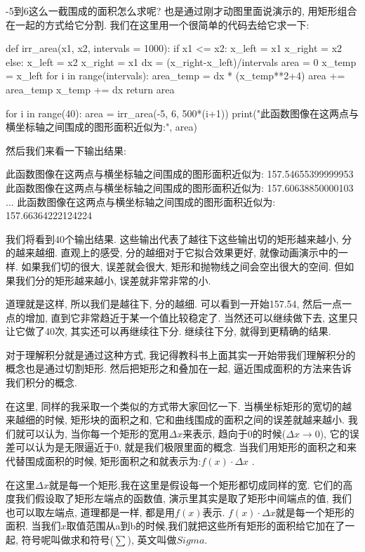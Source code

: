 -5到6这么一截围成的面积怎么求呢? 也是通过刚才动图里面说演示的, 用矩形组合在一起的方式给它分割. 我们在这里用一个很简单的代码去给它求一下:

\begin{python}
def irr_area(x1, x2, intervals = 1000):
    if x1 <= x2:
        x_left = x1
        x_right = x2
    else:
        x_left = x2
        x_right = x1
    dx = (x_right-x_left)/intervals
    area = 0
    x_temp = x_left
    for i in range(intervals):
        area_temp = dx * (x_temp**2+4)
        area += area_temp
        x_temp += dx
    return area
  
 for i in range(40):
    area = irr_area(-5, 6, 500*(i+1))
    print("此函数图像在这两点与横坐标轴之间围成的图形面积近似为:", area)
\end{python}

然后我们来看一下输出结果:

\begin{python}
此函数图像在这两点与横坐标轴之间围成的图形面积近似为: 157.54655399999953
此函数图像在这两点与横坐标轴之间围成的图形面积近似为: 157.60638850000103
...
此函数图像在这两点与横坐标轴之间围成的图形面积近似为: 157.66364222124224
\end{python}

我们将看到40个输出结果. 这些输出代表了越往下这些输出切的矩形越来越小, 分的越来越细. 直观上的感受, 分的越细对于它拟合效果更好, 就像动画演示中的一样. 如果我们切的很大, 误差就会很大, 矩形和抛物线之间会空出很大的空间. 但如果我们分的矩形越来越小, 误差就非常非常的小. 

道理就是这样, 所以我们是越往下, 分的越细. 可以看到一开始157.54, 然后一点一点的增加, 直到它非常趋近于某一个值比较稳定了. 当然还可以继续做下去, 这里只让它做了40次, 其实还可以再继续往下分. 继续往下分, 就得到更精确的结果. 

对于理解积分就是通过这种方式, 我记得教科书上面其实一开始带我们理解积分的概念也是通过切割矩形. 然后把矩形之和叠加在一起, 逼近围成面积的方法来告诉我们积分的概念. 

在这里, 同样的我采取一个类似的方式带大家回忆一下. 当横坐标矩形的宽切的越来越细的时候, 矩形块的面积之和, 它和曲线围成的面积之间的误差就越来越小. 我们就可以认为, 当你每一个矩形的宽用$\Delta x$来表示, 趋向于0的时候($\Delta x \to 0$), 它的误差可以认为是无限逼近于0, 就是我们极限里面的概念. 当我们用矩形的面积之和来代替围成面积的时候, 矩形面积之和就表示为:$f(x) \cdot \Delta x$ . 

在这里$\Delta x$就是每一个矩形,我在这里是假设每一个矩形都切成同样的宽. 它们的高度我们假设取了矩形左端点的函数值, 演示里其实是取了矩形中间端点的值, 我们也可以取左端点, 道理都是一样, 都是用$f(x)$表示. $f(x)\cdot \Delta x$就是每一个矩形的面积. 当我们$x$取值范围从a到b的时候,我们就把这些所有矩形的面积给它加在了一起, 符号呢叫做求和符号($\sum$), 英文叫做$\mathord{Sigma}$. 

